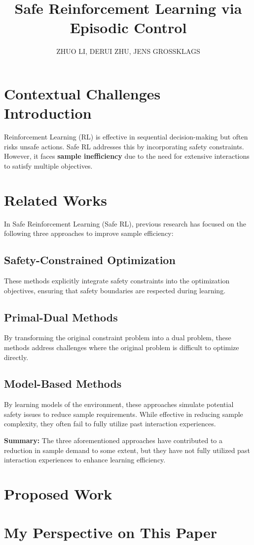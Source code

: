 \documentclass[9pt,a4paper,twocolumn,twoside]{tau-class/tau}
\title{Safe Reinforcement Learning via Episodic Control}
\author{ZHUO LI, DERUI ZHU, JENS GROSSKLAGS}
\begin{document}
		
    \maketitle 
    \thispagestyle{firststyle} 
    \tauabstract 
    

\section{Contextual Challenges Introduction}
Reinforcement Learning (RL) is effective in sequential decision-making but often risks unsafe actions. Safe RL addresses this by incorporating safety constraints. However, it faces \textbf{sample inefficiency} due to the need for extensive interactions to satisfy multiple objectives.
\section{Related Works}
In Safe Reinforcement Learning (Safe RL), previous research has focused on the following three approaches to improve sample efficiency:
\subsection{Safety-Constrained Optimization}
These methods explicitly integrate safety constraints into the optimization objectives, ensuring that safety boundaries are respected during learning.
\subsection{Primal-Dual Methods}
By transforming the original constraint problem into a dual problem, these methods address challenges where the original problem is difficult to optimize directly.
\subsection{Model-Based Methods}
By learning models of the environment, these approaches simulate potential safety issues to reduce sample requirements. While effective in reducing sample complexity, they often fail to fully utilize past interaction experiences.

\textbf{Summary:} The three aforementioned approaches have contributed to a reduction in sample demand to some extent, but they have not fully utilized past interaction experiences to enhance learning efficiency.
\section{Proposed Work}

    
\section{My Perspective on This Paper}


%
\end{document}
